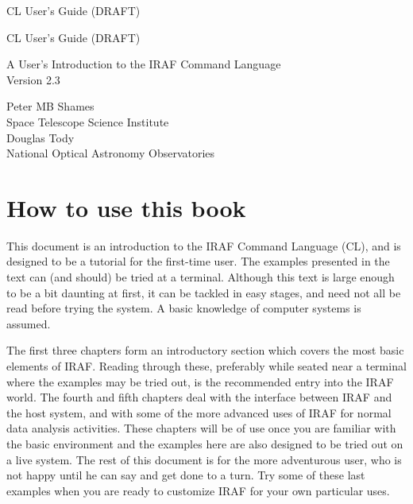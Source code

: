 \clearpage 
\pagestyle{myheadings}
	 {\hspace*{2.1in}CL User's Guide (DRAFT)}

\tableofcontents

\thispagestyle{empty}
\newpage

\pagestyle{myheadings}
	 {\hspace*{2.1in}CL User's Guide (DRAFT)}

\begin{center} \vspace*{0.5in} \large \bf

A User's Introduction to the IRAF Command Language \\ \medskip
Version 2.3 \\

\bigskip

\smcaps Peter MB Shames\\
\tenrm Space Telescope Science Institute\\
\medskip
\smcaps Douglas Tody\\
\tenrm National Optical Astronomy Observatories\\
\vskip 1cm

\end{center} \rm

\section*{How to use this book}

\ppind
This document is an introduction to the IRAF
Command Language (CL), and is designed to be a tutorial
for the first-time user.  The examples presented in the text can
(and should) be tried at a terminal.  Although this text is
large enough to be a bit daunting at first, it can be tackled
in easy stages, and need not all be read before trying the system.  
A basic knowledge of computer systems is assumed.

The first three chapters form an introductory section
which covers the most basic elements of IRAF.  Reading through these,
preferably while seated near a terminal where the examples may be tried 
out, is the recommended entry into the IRAF world.  The fourth and fifth 
chapters deal with the interface between IRAF and the host system,
and with some of the more advanced uses of IRAF for normal data
analysis activities.  These chapters will be of use once you are familiar
with the basic environment and the examples here are also designed
to be tried out on a live system.  The rest of this document is for the
more adventurous user, who is not happy until he can say 
and get  done to a turn.  Try some of these last examples
when you are ready to customize IRAF for your own particular uses.

